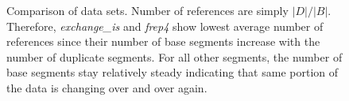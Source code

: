 \begin{figure}[!t]
\centerline{
\hfil
{}
\hfil
{}}
\caption{Comparison of data sets. Number of references are simply $|D|/|B|$. Therefore, \emph{exchange\_is} and \emph{frep4} show lowest average number of references since their number of base segments increase with the number of duplicate segments. For all other segments, the number of base segments stay relatively steady indicating that same portion of the data is changing over and over again.}
\label{data_comp}
\end{figure}

